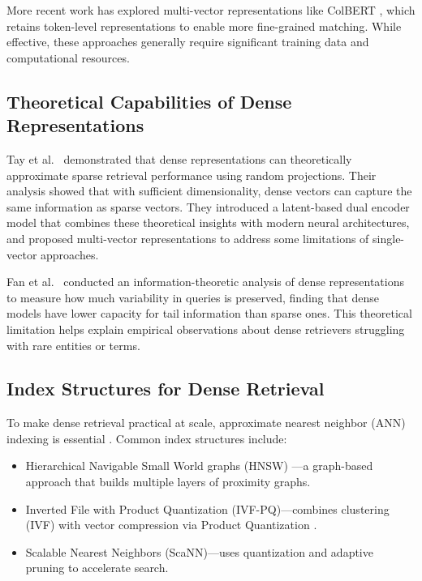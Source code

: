 \documentclass[conference,anonymous]{IEEEtran}
\begin{document}
More recent work has explored multi-vector representations like ColBERT \cite{khattab2020colbert}, which retains token-level representations to enable more fine-grained matching. While effective, these approaches generally require significant training data and computational resources.

\subsection{Theoretical Capabilities of Dense Representations}
Tay et al.\ \cite{tay2020sparse} demonstrated that dense representations can theoretically approximate sparse retrieval performance using random projections. Their analysis showed that with sufficient dimensionality, dense vectors can capture the same information as sparse vectors. They introduced a latent-based dual encoder model that combines these theoretical insights with modern neural architectures, and proposed multi-vector representations to address some limitations of single-vector approaches.

Fan et al.\ \cite{fan2022information} conducted an information-theoretic analysis of dense representations to measure how much variability in queries is preserved, finding that dense models have lower capacity for tail information than sparse ones. This theoretical limitation helps explain empirical observations about dense retrievers struggling with rare entities or terms.

\subsection{Index Structures for Dense Retrieval}
To make dense retrieval practical at scale, approximate nearest neighbor (ANN) indexing is essential \cite{johnson2019billion}. Common index structures include:
\begin{itemize}
\item Hierarchical Navigable Small World graphs (HNSW) \cite{malkov2019efficient}---a graph-based approach that builds multiple layers of proximity graphs.

\item Inverted File with Product Quantization (IVF-PQ)---combines clustering (IVF) with vector compression via Product Quantization \cite{jegou2010product}.

\item Scalable Nearest Neighbors (ScaNN)---uses quantization and adaptive pruning to accelerate search.
\end{itemize}
\end{document}
